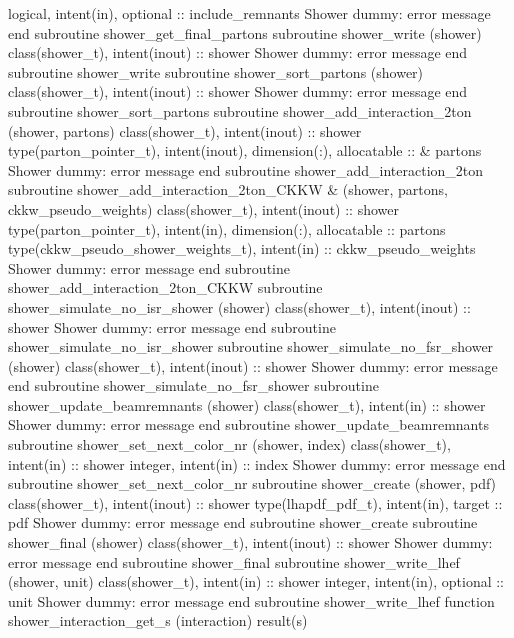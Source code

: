       logical, intent(in), optional :: include_remnants
      \LA{}Shower dummy: error message\RA{}
    end subroutine shower_get_final_partons
    subroutine shower_write (shower)
      class(shower_t), intent(inout) :: shower
      \LA{}Shower dummy: error message\RA{}
    end subroutine shower_write
    subroutine shower_sort_partons (shower)
      class(shower_t), intent(inout) :: shower
      \LA{}Shower dummy: error message\RA{}
    end subroutine shower_sort_partons
    subroutine shower_add_interaction_2ton (shower, partons)
      class(shower_t), intent(inout) :: shower
      type(parton_pointer_t), intent(inout), dimension(:), allocatable :: &
           partons
      \LA{}Shower dummy: error message\RA{}
    end subroutine shower_add_interaction_2ton
    subroutine shower_add_interaction_2ton_CKKW &
         (shower, partons, ckkw_pseudo_weights)
      class(shower_t), intent(inout) :: shower
      type(parton_pointer_t), intent(in), dimension(:), allocatable :: partons
      type(ckkw_pseudo_shower_weights_t), intent(in) :: ckkw_pseudo_weights
      \LA{}Shower dummy: error message\RA{}
    end subroutine shower_add_interaction_2ton_CKKW
    subroutine shower_simulate_no_isr_shower (shower)
      class(shower_t), intent(inout) :: shower
      \LA{}Shower dummy: error message\RA{}
    end subroutine shower_simulate_no_isr_shower
    subroutine shower_simulate_no_fsr_shower (shower)
      class(shower_t), intent(inout) :: shower
      \LA{}Shower dummy: error message\RA{}
    end subroutine shower_simulate_no_fsr_shower
    subroutine shower_update_beamremnants (shower)
      class(shower_t), intent(in) :: shower
      \LA{}Shower dummy: error message\RA{}
    end subroutine shower_update_beamremnants
    subroutine shower_set_next_color_nr (shower, index)
      class(shower_t), intent(in) :: shower
      integer, intent(in) :: index
      \LA{}Shower dummy: error message\RA{}
    end subroutine shower_set_next_color_nr
    subroutine shower_create (shower, pdf)
      class(shower_t), intent(inout) :: shower
      type(lhapdf_pdf_t), intent(in), target :: pdf
      \LA{}Shower dummy: error message\RA{}
    end subroutine shower_create
    subroutine shower_final (shower)
      class(shower_t), intent(inout) :: shower
      \LA{}Shower dummy: error message\RA{}
    end subroutine shower_final
    subroutine shower_write_lhef (shower, unit)
      class(shower_t), intent(in) :: shower
      integer, intent(in), optional :: unit
      \LA{}Shower dummy: error message\RA{}
    end subroutine shower_write_lhef
    function shower_interaction_get_s (interaction) result(s)

